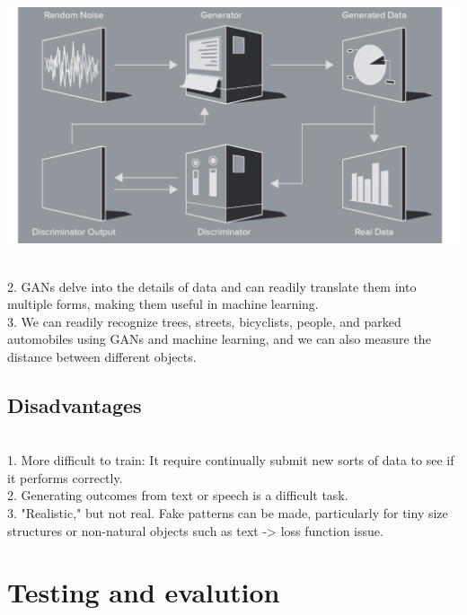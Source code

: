 \documentclass[14pt]{article}
\begin{document}
\begin{center}
    \includegraphics[width = 12 cm ]{20.png}
    \\ \\ 
\end{center} 
2. GANs delve into the details of data and can readily translate them into multiple forms, making them useful in machine learning.
\\
3. We can readily recognize trees, streets, bicyclists, people, and parked automobiles using GANs and machine learning, and we can also measure the distance between different objects.
\\
\subsection{Disadvantages}
\\
1. More difficult to train: It require continually submit new sorts of data to see if it performs correctly.
\\
2. Generating outcomes from text or speech is a difficult task.
\\
3. "Realistic," but not real. Fake patterns can be made, particularly for tiny size structures or non-natural objects such as text -> loss function issue.
\\


\section{Testing and evalution}\\
\end{document}
